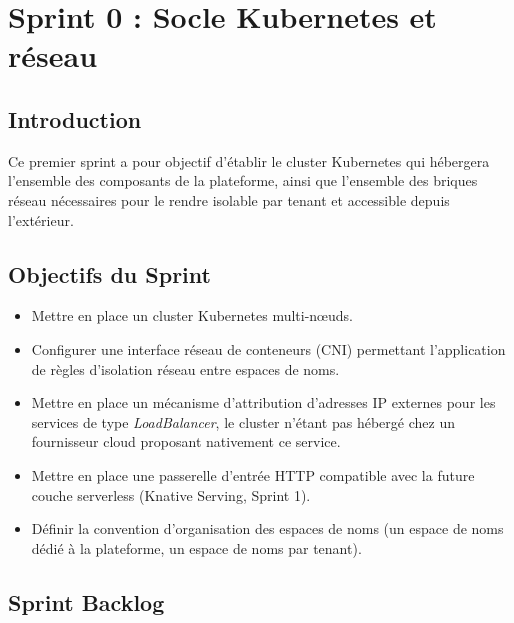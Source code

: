 \section{Sprint 0 : Socle Kubernetes et réseau}

\subsection{Introduction}

Ce premier sprint a pour objectif d'établir le cluster Kubernetes qui hébergera l'ensemble des composants de la plateforme, ainsi que l'ensemble des briques réseau nécessaires pour le rendre isolable par tenant et accessible depuis l'extérieur.

\subsection{Objectifs du Sprint}

\begin{itemize}
    \item Mettre en place un cluster Kubernetes multi-nœuds.
    \item Configurer une interface réseau de conteneurs (CNI) permettant l'application de règles d'isolation réseau entre espaces de noms.
    \item Mettre en place un mécanisme d'attribution d'adresses IP externes pour les services de type \textit{LoadBalancer}, le cluster n'étant pas hébergé chez un fournisseur cloud proposant nativement ce service.
    \item Mettre en place une passerelle d'entrée HTTP compatible avec la future couche serverless (Knative Serving, Sprint 1).
    \item Définir la convention d'organisation des espaces de noms (un espace de noms dédié à la plateforme, un espace de noms par tenant).
\end{itemize}

\subsection{Sprint Backlog}

